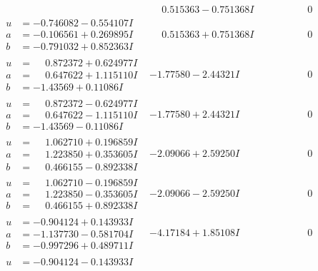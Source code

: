 \documentclass[1p]{elsarticle_modified}
\theoremstyle{definition}
\begin{document}
$$\begin{array}{c|c|c}
 & \phantom{-}0.515363 - 0.751368 I & \phantom{-0.000000 } 0 \\ \hline\begin{aligned}
u &= -0.746082 - 0.554107 I \\
a &= -0.106561 + 0.269895 I \\
b &= -0.791032 + 0.852363 I\end{aligned}
 & \phantom{-}0.515363 + 0.751368 I & \phantom{-0.000000 } 0 \\ \hline\begin{aligned}
u &= \phantom{-}0.872372 + 0.624977 I \\
a &= \phantom{-}0.647622 + 1.115110 I \\
b &= -1.43569 + 0.11086 I\end{aligned}
 & -1.77580 - 2.44321 I & \phantom{-0.000000 } 0 \\ \hline\begin{aligned}
u &= \phantom{-}0.872372 - 0.624977 I \\
a &= \phantom{-}0.647622 - 1.115110 I \\
b &= -1.43569 - 0.11086 I\end{aligned}
 & -1.77580 + 2.44321 I & \phantom{-0.000000 } 0 \\ \hline\begin{aligned}
u &= \phantom{-}1.062710 + 0.196859 I \\
a &= \phantom{-}1.223850 + 0.353605 I \\
b &= \phantom{-}0.466155 - 0.892338 I\end{aligned}
 & -2.09066 + 2.59250 I & \phantom{-0.000000 } 0 \\ \hline\begin{aligned}
u &= \phantom{-}1.062710 - 0.196859 I \\
a &= \phantom{-}1.223850 - 0.353605 I \\
b &= \phantom{-}0.466155 + 0.892338 I\end{aligned}
 & -2.09066 - 2.59250 I & \phantom{-0.000000 } 0 \\ \hline\begin{aligned}
u &= -0.904124 + 0.143933 I \\
a &= -1.137730 - 0.581704 I \\
b &= -0.997296 + 0.489711 I\end{aligned}
 & -4.17184 + 1.85108 I & \phantom{-0.000000 } 0 \\ \hline\begin{aligned}
u &= -0.904124 - 0.143933 I \\

\end{aligned}
\end{array}$$
\end{document}

